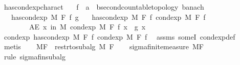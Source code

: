 \begin{isabellebody}
\isamarkupfalse%
\ has{\isacharunderscore}{\kern0pt}cond{\isacharunderscore}{\kern0pt}exp{\isacharunderscore}{\kern0pt}charact{\isacharcolon}{\kern0pt}\isanewline
\ \ \ f\ {\isacharcolon}{\kern0pt}{\isacharcolon}{\kern0pt}\ {\isachardoublequoteopen}{\isacharprime}{\kern0pt}a\ {\isasymRightarrow}\ {\isacharprime}{\kern0pt}b{\isacharcolon}{\kern0pt}{\isacharcolon}{\kern0pt}{\isacharbraceleft}{\kern0pt}second{\isacharunderscore}{\kern0pt}countable{\isacharunderscore}{\kern0pt}topology{\isacharcomma}{\kern0pt}\ banach{\isacharbraceright}{\kern0pt}{\isachardoublequoteclose}\isanewline
\ \ \ {\isachardoublequoteopen}has{\isacharunderscore}{\kern0pt}cond{\isacharunderscore}{\kern0pt}exp\ M\ F\ f\ g{\isachardoublequoteclose}\isanewline
\ \ \ {\isachardoublequoteopen}has{\isacharunderscore}{\kern0pt}cond{\isacharunderscore}{\kern0pt}exp\ M\ F\ f\ {\isacharparenleft}{\kern0pt}cond{\isacharunderscore}{\kern0pt}exp\ M\ F\ f{\isacharparenright}{\kern0pt}{\isachardoublequoteclose}\isanewline
\ \ \ \ \ \ \ \ {\isachardoublequoteopen}AE\ x\ in\ M{\isachardot}{\kern0pt}\ cond{\isacharunderscore}{\kern0pt}exp\ M\ F\ f\ x\ {\isacharequal}{\kern0pt}\ g\ x{\isachardoublequoteclose}\isanewline
%
\isadelimproof
%
\endisadelimproof
%
\isatagproof
{}\isamarkupfalse%
\ {\isacharminus}{\kern0pt}\isanewline
\ \ \isamarkupfalse%
\ cond{\isacharunderscore}{\kern0pt}exp{\isacharcolon}{\kern0pt}\ {\isachardoublequoteopen}has{\isacharunderscore}{\kern0pt}cond{\isacharunderscore}{\kern0pt}exp\ M\ F\ f\ {\isacharparenleft}{\kern0pt}cond{\isacharunderscore}{\kern0pt}exp\ M\ F\ f{\isacharparenright}{\kern0pt}{\isachardoublequoteclose}\ \isamarkupfalse%
\ assms\ someI\ cond{\isacharunderscore}{\kern0pt}exp{\isacharunderscore}{\kern0pt}def\ \isamarkupfalse%
\ metis\isanewline
\ \ \isamarkupfalse%
\ {\isacharquery}{\kern0pt}MF\ {\isacharequal}{\kern0pt}\ {\isachardoublequoteopen}restr{\isacharunderscore}{\kern0pt}to{\isacharunderscore}{\kern0pt}subalg\ M\ F{\isachardoublequoteclose}\isanewline
\ \ \isamarkupfalse%
\ sigma{\isacharunderscore}{\kern0pt}finite{\isacharunderscore}{\kern0pt}measure\ {\isacharquery}{\kern0pt}MF\ \isamarkupfalse%
\ {\isacharparenleft}{\kern0pt}rule\ sigma{\isacharunderscore}{\kern0pt}fin{\isacharunderscore}{\kern0pt}subalg{\isacharparenright}{\kern0pt}\isanewline
\ \ \isacommand{{\isacharbraceleft}{\kern0pt}}\isamarkupfalse%
\isanewline
\ \ \ \ \isamarkupfalse%

\end{isabellebody}
